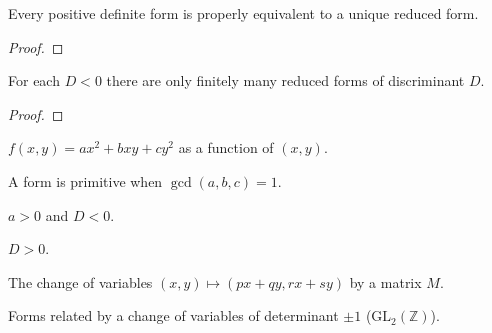 \begin{theorem}
  \label{thm:reduction}
  \leanok
  Every positive definite form is properly equivalent to a unique reduced form.
\end{theorem}
\begin{proof}
\end{proof}

\begin{theorem}
  \label{thm:finite_class_number}
  \leanok
  For each $D < 0$ there are only finitely many reduced forms of discriminant $D$.
\end{theorem}
\begin{proof}
\end{proof}

\begin{definition}
  \label{def:form_eval}
  \leanok
  $f(x,y) = a x^2 + b x y + c y^2$ as a function of $(x,y)$.
\end{definition}

\begin{definition}
  \label{def:primitive}
  \leanok
  A form is primitive when $\gcd(a,b,c)=1$.
\end{definition}

\begin{definition}
  \label{def:posdef}
  \leanok
  $a > 0$ and $D < 0$.
\end{definition}

\begin{definition}[Indefinite]
  \label{def:indefinite}
  \leanok
  $D > 0$.
\end{definition}

\begin{definition}
  \label{def:action}
  \leanok
  The change of variables $(x,y) \mapsto (px+qy, rx+sy)$ by a matrix $M$.
\end{definition}

\begin{definition}
  \label{def:equivalent}
  \leanok
  Forms related by a change of variables of determinant $\pm 1$
  ($\mathrm{GL}_2(\mathbb Z)$).
\end{definition}

